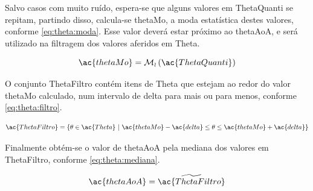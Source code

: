 Salvo casos com muito ruído, espera-se que alguns valores em \ac{ThetaQuanti} se repitam, partindo disso, calcula-se \ac{thetaMo}, a moda estatística destes valores, conforme \autoref{eq:theta:moda}.
Esse valor deverá estar próximo ao \ac{thetaAoA}, e será utilizado na filtragem dos valores aferidos em \ac{Theta}.

\begin{equation} \label{eq:theta:moda}
    \ac{thetaMo} = \operatorname{\mathcal{M_o}}\left( \ac{ThetaQuanti}  \right)
\end{equation}

O conjunto \ac{ThetaFiltro} contém itens de \ac{Theta} que estejam ao redor do valor \ac{thetaMo} calculado, num intervalo de \ac{delta} para mais ou para menos, conforme \autoref{eq:theta:filtro}.


\begin{equation} \label{eq:theta:filtro}
    \ac{ThetaFiltro} = \left\{\theta \in \ac{Theta}  ~\middle\vert~
    \ac{thetaMo} - \ac{delta} \leq \theta \leq \ac{thetaMo} + \ac{delta}\right\}
\end{equation}

Finalmente obtém-se o valor de \ac{thetaAoA} pela mediana dos valores em \ac{ThetaFiltro}, conforme \autoref{eq:theta:mediana}.

\begin{equation} \label{eq:theta:mediana}
    \ac{thetaAoA} = \widetilde{\ac{ThetaFiltro}}
\end{equation}

\pagebreak

























